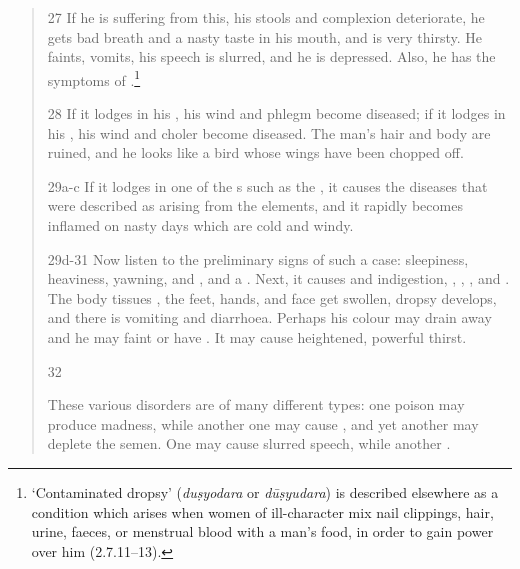 \begin{translation}
\begin{verse}
        \item[27]
        If he is suffering from this, his stools and complexion deteriorate, he gets
        bad breath and a nasty taste in his mouth, and is very thirsty.  He
        faints, vomits, his speech is slurred, and he is depressed.  Also, he has
        the symptoms of .\footnote{\label{dusyodara}`Contaminated dropsy'
        (\emph{duṣyodara} or \emph{dūṣyudara}) is described elsewhere as a
        condition which arises when women of ill-character mix nail clippings,
        hair, urine, faeces, or menstrual blood with a man's food, in order to
        gain power over him (2.7.11--13).}
        \item[28]
        If it lodges in his , his wind and phlegm become
        diseased; if it lodges in his , his wind and choler
        become diseased.  The man's hair and body are ruined, and he looks like a
        bird whose wings have been chopped off.
        \item[29a-c]
        If it lodges in one of the s such as the
        , it causes the diseases that were described as arising
        from the elements, and it rapidly becomes inflamed on nasty days which are
        cold and windy.
        
        \item[29d-31]
        Now listen to the preliminary signs of such a case: sleepiness, heaviness,
        yawning,  and , and a
        . Next, it causes
         and indigestion, ,
        , , and
        . The body tissues ,
        the feet, hands, and face get swollen, dropsy develops, and there is
        vomiting and diarrhoea. Perhaps his colour may drain away and he may faint
        or have .  It may cause heightened,
        powerful thirst.
        
        \item[32]
        \begin{sloppypar}
            These various disorders are of many different types: one poison may 
            produce
            madness, while another one may cause , and 
            yet
            another may deplete the semen. One may cause slurred speech, while 
            another
            .
        \end{sloppypar}
    \end{verse}


\end{translation}
